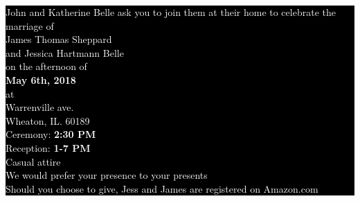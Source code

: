 \documentclass{article}
\begin{document}
\pagecolor{red!60!blue}
\vspace*{0.8in}

\colorbox{black}{\begin{minipage}{0.9\textwidth}
\begin{center}
\vspace{0.2in}
\textcolor{white}{John and Katherine Belle ask you to join them at their home to celebrate the marriage of \\ \vspace{0.1in} {\cursivefont \LARGE James Thomas Sheppard} \\ and {\cursivefont \Large Jessica Hartmann Belle} \vspace{0.1in} \\ on the afternoon of \\ {\bf May 6th, 2018} \\ \bigskip at \\  Warrenville ave. \\ Wheaton, IL. 60189 \\ \bigskip Ceremony: {\bf 2:30 PM} \\ Reception: {\bf 1-7 PM} \\ \bigskip Casual attire \\ \bigskip We would prefer your presence to your presents \\ \smallskip Should you choose to give, Jess and James are registered on Amazon.com} 
\end{center}
\end{minipage}}
\end{document}
